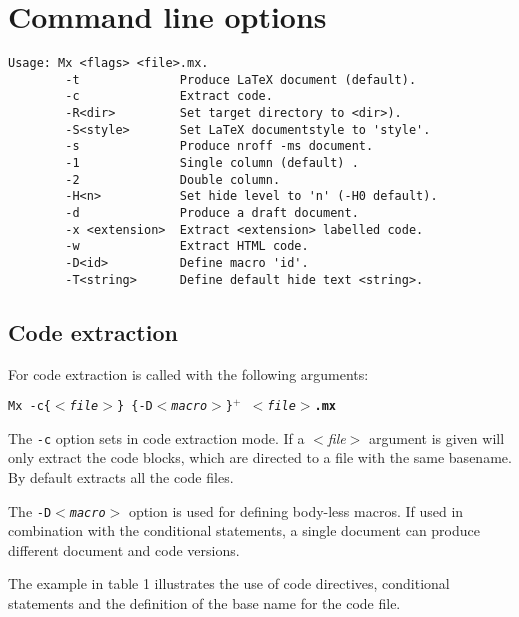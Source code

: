 \documentclass{article}
\begin{document}
\newpage
\section{Command line options}
\newcommand{\macro}{{$<${\it macro}$>$}}
\newcommand{\file}{{$<${\it file}$>$}}
\newcommand{\text}{{$<${\it text}$>$}}
\newcommand{\mxfile}{{\file{\bf .mx}}}
\newcommand{\example}[2]{
	\begin{table}
	\begin{tabular}{|lp{0.5 \linewidth}|}\hline #2 \hline \end{tabular}
	\caption{#1}
	\end{table}}
\newcommand{\n}{$<n>$}

\begin{verbatim}
Usage: Mx <flags> <file>.mx.
        -t              Produce LaTeX document (default).
        -c              Extract code.
        -R<dir>         Set target directory to <dir>).
        -S<style>       Set LaTeX documentstyle to 'style'.
        -s              Produce nroff -ms document.
        -1              Single column (default) .
        -2              Double column.
        -H<n>           Set hide level to 'n' (-H0 default).
        -d              Produce a draft document.
        -x <extension>  Extract <extension> labelled code.
        -w              Extract HTML code.
        -D<id>          Define macro 'id'.
        -T<string>      Define default hide text <string>.
\end{verbatim}

\subsection{Code extraction}

For code extraction \Mx is called with the following arguments:
\noindent
\begin{center}
        {\tt Mx -c\{\file\} \{-D\macro\}$^+$ \mxfile }
\end{center}

The {\tt -c} option sets \Mx in code extraction mode. If a \file
argument is given \Mx will only extract the code blocks, which are
directed to a file with the same basename. 
By default \Mx extracts all the code files. 

The {\tt -D\macro} option is used for defining body-less macros. If used in
combination with the conditional statements, a single \Mx document can
produce different document and code versions.

The example in table 1 illustrates the use of code directives,
conditional statements and the definition of the base name for the
code file.
\end{document}
